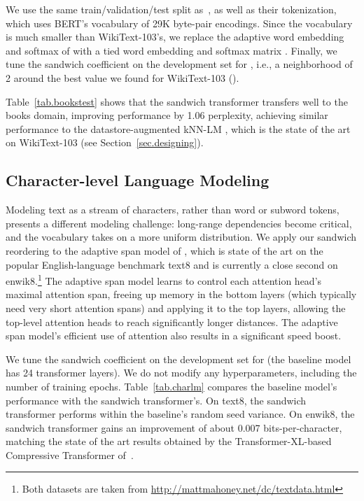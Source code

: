 \documentclass[11pt,a4paper]{article}
\begin{document}
We use the same train/validation/test split as~\citet{urvashi}, as well as their tokenization, which uses BERT's vocabulary of 29K byte-pair encodings.
Since the vocabulary is much smaller than WikiText-103's, we replace the adaptive word embedding and softmax of \citet{baevski2018adaptive} with a tied word embedding and softmax matrix \cite{press2017,inan2017}.
Finally, we tune the sandwich coefficient on the development set for , i.e., a neighborhood of 2 around the best value we found for WikiText-103 ().

Table~\ref{tab.bookstest} shows that the sandwich transformer transfers well to the books domain, improving performance by 1.06 perplexity, achieving similar performance to the datastore-augmented kNN-LM \cite{urvashi}, which is the state of the art on WikiText-103 (see Section~\ref{sec.designing}).




\subsection{Character-level Language Modeling}
\label{sec.charlm}

Modeling text as a stream of characters, rather than word or subword tokens, presents a different modeling challenge: long-range dependencies become critical, and the vocabulary takes on a more uniform distribution.
We apply our sandwich reordering to the adaptive span model of \citet{Sukhbaatar2019}, which is state of the art on the popular English-language benchmark text8 and is currently a close second on enwik8.\footnote{{Both datasets are taken from \url{http://mattmahoney.net/dc/textdata.html}}}
The adaptive span model learns to control each attention head's maximal attention span, freeing up memory in the bottom layers (which typically need very short attention spans) and applying it to the top layers, allowing the top-level attention heads to reach significantly longer distances.
The adaptive span model's efficient use of attention also results in a significant speed boost.

We tune the sandwich coefficient on the development set for  (the baseline model has 24 transformer layers). We do not modify any hyperparameters, including the number of training epochs.
Table~\ref{tab.charlm} compares the baseline model's performance with the sandwich transformer's. 
On text8, the sandwich transformer performs within the baseline's random seed variance. On enwik8, the sandwich transformer gains an improvement of about 0.007 bits-per-character, matching the state of the art results obtained by the Transformer-XL-based Compressive Transformer of~\citet{compressive}.
\end{document}
